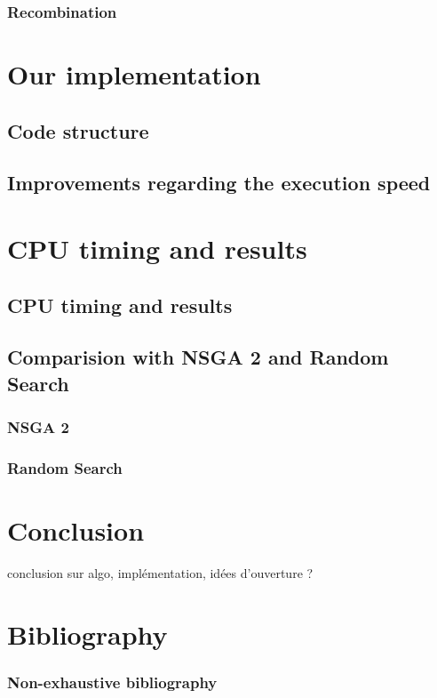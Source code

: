 \documentclass{beamer}
\begin{document}
\begin{frame}
\frametitle{Recombination}

\end{frame}

\section{Our implementation}
\subsection{Code structure}
\begin{frame}

\end{frame}

\subsection{Improvements regarding the execution speed}
\begin{frame}

\end{frame}

\section{CPU timing and results}
\subsection{CPU timing and results}
\begin{frame}

\end{frame}

\subsection{Comparision with NSGA 2 and Random Search}
\begin{frame}
\frametitle{NSGA 2}

\end{frame}

\begin{frame}
\frametitle{Random Search}

\end{frame}

\section{Conclusion}
\begin{frame}
conclusion sur algo, implémentation, idées d'ouverture ?
\end{frame}

\section{Bibliography}
\begin{frame}
\frametitle{Non-exhaustive bibliography}

\end{frame}
\end{document}
